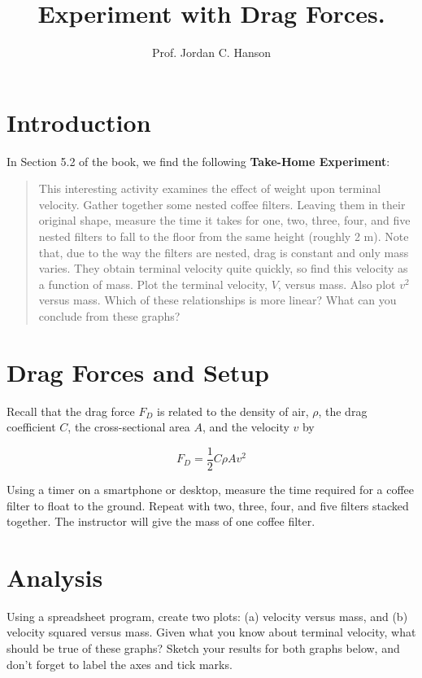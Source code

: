 \documentclass{article}
\begin{document}
\title{Experiment with Drag Forces.}
\author{Prof. Jordan C. Hanson}

\maketitle

\section{Introduction}

In Section 5.2 of the book, we find the following \textbf{Take-Home Experiment}:

\begin{quote}
This interesting activity examines the effect of weight upon terminal velocity. Gather together some nested coffee filters. Leaving them in their original shape, measure the time it takes for one, two, three, four, and five nested filters to fall to the floor from the same height (roughly 2 m).  Note that, due to the way the filters are nested, drag is constant and only mass varies. They obtain terminal velocity quite quickly, so find this velocity as a function of mass.  Plot the terminal velocity, $V$, versus mass. Also plot $v^2$ versus mass.  Which of these relationships is more linear? What can you conclude from these graphs?
\end{quote}

\section{Drag Forces and Setup}

Recall that the drag force $F_D$ is related to the density of air, $\rho$, the drag coefficient $C$, the cross-sectional area $A$, and the velocity $v$ by

\begin{equation}
F_D = \frac{1}{2}C\rho A v^2
\end{equation}

Using a timer on a smartphone or desktop, measure the time required for a coffee filter to float to the ground.  Repeat with two, three, four, and five filters stacked together.  The instructor will give the mass of one coffee filter.

\section{Analysis}

Using a spreadsheet program, create two plots: (a) velocity versus mass, and (b) velocity squared versus mass.  Given what you know about terminal velocity, what should be true of these graphs?  Sketch your results for both graphs below, and don't forget to label the axes and tick marks.
\end{document}
